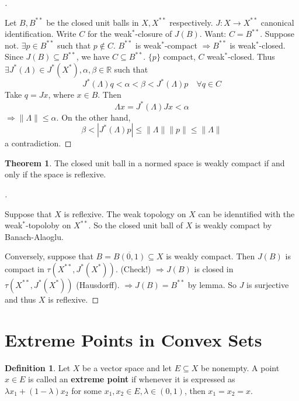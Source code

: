 \documentclass{article}
\theoremstyle{definition}
\newtheorem{thm}{Theorem}
\newtheorem{dfn}{Definition}
\newenvironment{proofs}[1][\proofname]{%
  \begin{proof}[#1]$ $\par\nobreak\ignorespaces
}{%
  \end{proof}
}
\newcommand{\RR}{\mathbb R}
\newcommand{\Ra}{\Rightarrow}
\begin{document}
\begin{proofs}
	Let $B, B^{**}$ be the closed unit balls in $X, X^{**}$ respectively.
	$J: X \to X^{**}$ canonical identification.
	Write $C$ for the weak$^*$-closure of $J(B)$.
	Want: $C = B^{**}$.
	Suppose not.
	$\exists p \in B^{**}$ such that $p \notin C$.
	$B^{**}$ is weak$^*$-compact $\Ra B^{**}$ is weak$^*$-closed.
	Since $J(B) \subseteq B^{**}$, we have $C \subseteq B^{**}$.
	$\{p\}$ compact, $C$ weak$^*$-closed.
	Thus $\exists J^*(\Lambda) \in J^*(X^*), \alpha, \beta \in \RR$ such that
	\[
		J^*(\Lambda) q < \alpha < \beta < J^*(\Lambda) p \quad \forall q \in C
	\]
	Take $q = Jx$, where $x \in B$.
	Then
	\[
		\Lambda x = J^*(\Lambda) J x < \alpha
	\]
	$\Ra \|\Lambda\| \leq \alpha$.
	On the other hand, 
	\[
		\beta < |J^*(\Lambda) p| \leq \|\Lambda\| \|p\| \leq \|\Lambda\|
	\]
	a contradiction.
\end{proofs}

\begin{thm}
	The closed unit ball in a normed space is weakly compact if and only if the space is reflexive.
\end{thm}

\begin{proofs}
	Suppose that $X$ is reflexive.
	The weak topology on $X$ can be idenntified with the weak$^*$-topoloby on $X^{**}$.
	So the closed unit ball of $X$ is weakly compact by Banach-Alaoglu.
	
	\par Conversely, suppose that $B = \overline{B(0, 1)} \subseteq X$ is weakly compact.
	Then $J(B)$ is compact in $\tau(X^{**}, J^*(X^*))$. (Check!)
	$\Ra J(B)$ is closed in $\tau(X^{**}, J^*(X^*))$ (Hausdorff).
	$\Ra J(B) = B^{**}$ by lemma.
	So $J$ is surjective and thus $X$ is reflexive.
\end{proofs}

\section{Extreme Points in Convex Sets}

\begin{dfn}
	Let $X$ be a vector space and let $E \subseteq X$ be nonempty.
	A point $x \in E$ is called an \textbf{extreme point} if whenever it is expressed as $\lambda x_1 + (1 - \lambda) x_2$ for some $x_1, x_2 \in E, \lambda \in (0, 1)$, then $x_1 = x_2 = x$.	
\end{dfn}
\end{document}
